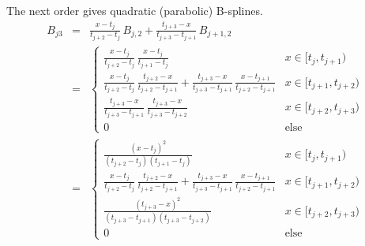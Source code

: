 \documentclass[12pt]{report}
\begin{document}
The next order gives quadratic (parabolic) B-splines.
\begin{eqnarray*}
  B_{j3}&=&\frac{x-t_j}{t_{j+2}-t_j}\,B_{j,2}
  +\frac{t_{j+3}-x}{t_{j+3}-t_{j+1}}\,B_{j+1,2}\\
  &=&
  \begin{cases}
    \frac{x-t_j}{t_{j+2}-t_j}\,\frac{x-t_j}{t_{j+1}-t_j} & x\in[t_j,t_{j+1})\\
    \frac{x-t_j}{t_{j+2}-t_j}\,\frac{t_{j+2}-x}{t_{j+2}-t_{j+1}}
    +\frac{t_{j+3}-x}{t_{j+3}-t_{j+1}}\,\frac{x-t_{j+1}}{t_{j+2}-t_{j+1}} & x\in[t_{j+1},t_{j+2})\\
    \frac{t_{j+3}-x}{t_{j+3}-t_{j+1}}\,\frac{t_{j+3}-x}{t_{j+3}-t_{j+2}} & x\in[t_{j+2},t_{j+3})\\
    0 & \mbox{else}
  \end{cases}\\
  &=&
  \begin{cases}
    \frac{(x-t_j)^2}{(t_{j+2}-t_j)(t_{j+1}-t_j)} & x\in[t_j,t_{j+1})\\
    \frac{x-t_j}{t_{j+2}-t_j}\,\frac{t_{j+2}-x}{t_{j+2}-t_{j+1}}
    +\frac{t_{j+3}-x}{t_{j+3}-t_{j+1}}\,\frac{x-t_{j+1}}{t_{j+2}-t_{j+1}} & x\in[t_{j+1},t_{j+2})\\
    \frac{(t_{j+3}-x)^2}{(t_{j+3}-t_{j+1})(t_{j+3}-t_{j+2})} & x\in[t_{j+2},t_{j+3})\\
    0 & \mbox{else}
  \end{cases}
\end{eqnarray*}
\end{document}
